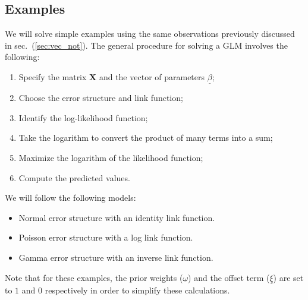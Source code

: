 \documentclass{article}
\begin{document}
\subsection{Examples}
We will solve simple examples using the same observations previously discussed in sec.~(\ref{sec:vec_not}). The general procedure for solving a GLM involves the following:
\begin{enumerate}
    \item Specify the matrix $\mathbf{X}$ and the vector of parameters $\underline{\beta}$;
    \item Choose the error structure and link function;
    \item Identify the log-likelihood function;
    \item Take the logarithm to convert the product of many terms into a sum;
    \item Maximize the logarithm of the likelihood function;
    \item Compute the predicted values.
\end{enumerate}
We will follow the following models:
\begin{itemize}
    \item Normal error structure with an identity link function.
    \item Poisson error structure with a log link function.
    \item Gamma error structure with an inverse link function.
\end{itemize}
Note that for these examples, the prior weights ($\underline{\omega}$) and the offset term ($\underline{\xi}$) are set to $1$ and $0$ respectively in order to simplify these calculations.
\end{document}
